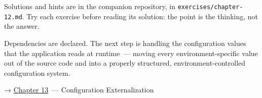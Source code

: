 \noindent{}Solutions and hints are in the companion repository, in \texttt{exercises/}\allowbreak{}\texttt{chapter-12.md}. Try each exercise before reading its solution: the point is the thinking, not the answer.

\label{12-dependency-declaration:whats-next}

Dependencies are declared. The next step is handling the configuration values that the application reads at runtime~--- moving every environment-specific value out of the source code and into a properly structured, environment-controlled configuration system.

\noindent{}→ \hyperref[ch:13-configuration-externalization]{Chapter 13}~--- Configuration Externalization
